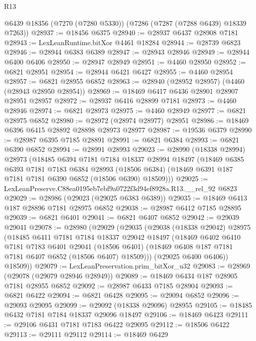 \begin{lexlean}{R13}
\begin{coremodule}
    @6439
    @18356
    (@7270 (@7280 @5330))
    (@7286 (@7287 (@7288 @6439) @18339 @7263))
@28937 := @18456 @6375
@28940 := @28937 @6437 @28908 @7181
@28943 := LexLeanRuntime.bitXor @4461 @18284
@28944 := @28739 @6823
@28946 := @28944 @6383 @6389
@28947 := @28943 @28946
@28949 := @28944 @6400 @6406
@28950 := @28947 @28949
@28951 := @4460 @28950
@28952 := @6821 @28951
@28954 := @28944 @6421 @6427
@28955 := @4460 @28954
@28957 := @6821 @28955 @6852
@28963 := @28940 (@28952 @28957) (@4460 (@28943 @28950 @28954))
@28969 := @18469 @6417 @6436 @28901 @28907 @28951 @28957
@28972 := @28937 @6416 @28899 @7181
@28973 := @4460 @28946
@28974 := @6821 @28973
@28975 := @4460 @28949
@28977 := @6821 @28975 @6852
@28980 := @28972 (@28974 @28977) @28951
@28986 := @18469 @6396 @6415 @28892 @28898 @28973 @28977
@28987 := @19536 @6379
@28990 := @28987 @6395 @7185 @28891
@28991 := @6821 @6384
@28993 := @6821 @6390 @6852
@28994 := @28991 @28993
@29023 := @28990
    (@18338 @28994)
    @28973
    (@18485
      @6394
      @7181
      @7184
      @18337
      @28994
      @18497
      (@18469
        @6385
        @6393
        @7181
        @7183
        @6384
        @28993
        (@18506 @6384)
        (@18469 @6391 @187 @7181 @7181 @6390 @6852 (@18506 @6390) @18509)))
@29025 := LexLeanPreserve.C88ea0195eb7ebf9a0722f3d94ef8928a.R13.__rel_92 @6823
@29029 := @28986 (@29023 (@29025 @6383 @6389))
@29035 := @18469 @6413 @187 @28896 @7181 @28975 @6852
@29038 := @28987 @6412 @7185 @28895
@29039 := @6821 @6401
@29041 := @6821 @6407 @6852
@29042 := @29039 @29041
@29078 := @28980
    (@29029
      (@29035
        (@29038
          (@18338 @29042)
          @28975
          (@18485
            @6411
            @7181
            @7184
            @18337
            @29042
            @18497
            (@18469
              @6402
              @6410
              @7181
              @7183
              @6401
              @29041
              (@18506 @6401)
              (@18469 @6408 @187 @7181 @7181 @6407 @6852 (@18506 @6407) @18509)))
          (@29025 @6400 @6406))
        @18509))
@29079 := LexLeanPreservation.prim_bitXor_u32
@29083 := @28969 (@29078 (@29079 @28946 @28949))
@29089 := @18469 @6434 @187 @28905 @7181 @28955 @6852
@29092 := @28987 @6433 @7185 @28904
@29093 := @6821 @6422
@29094 := @6821 @6428
@29095 := @29094 @6852
@29096 := @29093 @29095
@29099 := @29092 (@18338 @29096) @28955
@29105 := @18485 @6432 @7181 @7184 @18337 @29096 @18497
@29106 := @18469 @6423
@29111 := @29106 @6431 @7181 @7183 @6422 @29095
@29112 := @18506 @6422
@29113 := @29111 @29112
@29114 := @18469 @6429

\end{coremodule}
\end{lexlean}
